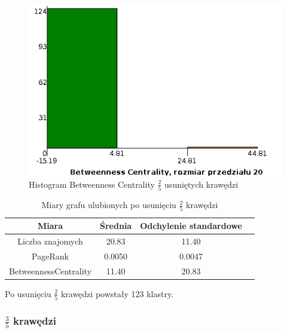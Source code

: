 \documentclass[10pt,a4paper]{article}
\begin{document}
\begin{figure}[H]
\centering
\caption{Histogram Betweenness Centrality $\frac{2}{5}$ usuniętych krawędzi}
\includegraphics[scale=0.6]{wyniki/final200Loved/2200lovedBCHist.png}
\end{figure}


\begin{table}[H]
  \caption{Miary grafu ulubionych po usunięciu $\frac{2}{5}$ krawędzi}
  \centering
    \begin{tabular}{cccc}
    \addlinespace
    \toprule
    Miara & Średnia  & Odchylenie standardowe \\
    \midrule
    Liczba znajomych & 20.83 & 11.40 \\
    PageRank & 0.0050 & 0.0047 \\
    BetweennessCentrality & 11.40 & 20.83 \\ 
    \bottomrule
    \end{tabular}
  \label{tab:addlabel}
\end{table}

Po usunięciu $\frac{2}{5}$ krawędzi powstały 123 klastry.

\subsubsection {$\frac{3}{5}$ krawędzi}
\end{document}
